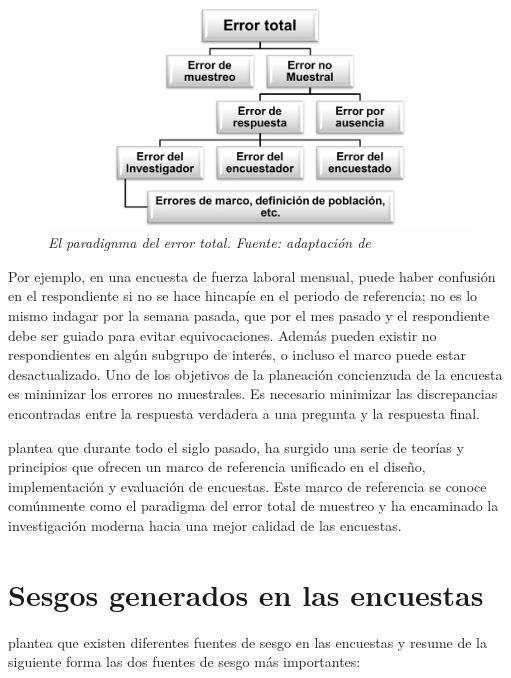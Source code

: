 \documentclass[
  12pt,
]{book}
\begin{document}
\begin{figure}
\centering
\includegraphics{Pics/Picture9.png}
\caption{\emph{El paradignma del error total. Fuente: adaptación de \citet{Groves_Fowler_Couper_Lepkowski_Singer_Tourangeau_2009}}}
\end{figure}

Por ejemplo, en una encuesta de fuerza laboral mensual, puede haber confusión en el respondiente si no se hace hincapíe en el periodo de referencia; no es lo mismo indagar por la semana pasada, que por el mes pasado y el respondiente debe ser guiado para evitar equivocaciones. Además pueden existir no respondientes en algún subgrupo de interés, o incluso el marco puede estar desactualizado. Uno de los objetivos de la planeación concienzuda de la encuesta es minimizar los errores no muestrales. Es necesario minimizar las discrepancias encontradas entre la respuesta verdadera a una pregunta y la respuesta final.

\citet{Groves_Fowler_Couper_Lepkowski_Singer_Tourangeau_2009} plantea que durante todo el siglo pasado, ha surgido una serie de teorías y principios que ofrecen un marco de referencia unificado en el diseño, implementación y evaluación de encuestas. Este marco de referencia se conoce comúnmente como el paradigma del error total de muestreo y ha encaminado la investigación moderna hacia una mejor calidad de las encuestas.

\hypertarget{sesgos-generados-en-las-encuestas}{%
\section{Sesgos generados en las encuestas}\label{sesgos-generados-en-las-encuestas}}

\citet{Gutierrez_2016} plantea que existen diferentes fuentes de sesgo en las encuestas y resume de la siguiente forma las dos fuentes de sesgo más importantes:
\end{document}
